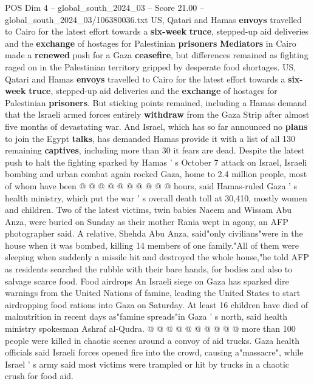 \begin{textsample}{POS Dim 4 – global\_south\_2024\_03 – Score 21.00 – global\_south\_2024\_03/106380036.txt}  \label{ex:f4_pos_102}
US, Qatari and Hamas \textbf{envoys} travelled to Cairo for the latest effort towards a \textbf{six-week} \textbf{truce}, stepped-up aid deliveries and the \textbf{exchange} of hostages for Palestinian \textbf{prisoners} \textbf{Mediators} in Cairo made a \textbf{renewed} push for a Gaza \textbf{ceasefire}, but differences remained as fighting raged on in the Palestinian territory gripped by desperate food shortages.
US, Qatari and Hamas \textbf{envoys} travelled to Cairo for the latest effort towards a \textbf{six-week} \textbf{truce}, stepped-up aid deliveries and the \textbf{exchange} of hostages for Palestinian \textbf{prisoners}.
But sticking points remained, including a Hamas demand that the Israeli armed forces entirely \textbf{withdraw} from the Gaza Strip after almost five months of devastating war.
And Israel, which has so far announced no \textbf{plans} to join the Egypt \textbf{talks}, has demanded Hamas provide it with a list of all 130 remaining \textbf{captives}, including more than 30 it fears are dead.
Despite the latest push to halt the fighting sparked by Hamas ' s October 7 attack on Israel, Israeli bombing and urban combat again rocked Gaza, home to 2.4 million people, most of whom have been @ @ @ @ @ @ @ @ @ @ hours, said Hamas-ruled Gaza ' s health ministry, which put the war ' s overall death toll at 30,410, mostly women and children.
Two of the latest victims, twin babies Naeem and Wissam Abu Anza, were buried on Sunday as their mother Rania wept in agony, an AFP photographer said.
A relative, Shehda Abu Anza, said"only civilians"were in the house when it was bombed, killing 14 members of one family."All of them were sleeping when suddenly a missile hit and destroyed the whole house,"he told AFP as residents searched the rubble with their bare hands, for bodies and also to salvage scarce food.
Food airdrops An Israeli siege on Gaza has sparked dire warnings from the United Nations of famine, leading the United States to start airdropping food rations into Gaza on Saturday.
At least 16 children have died of malnutrition in recent days as"famine spreads"in Gaza ' s north, said health ministry spokesman Ashraf al-Qudra. @ @ @ @ @ @ @ @ @ @ more than 100 people were killed in chaotic scenes around a convoy of aid trucks.
Gaza health officials said Israeli forces opened fire into the crowd, causing a"massacre", while Israel ' s army said most victims were trampled or hit by trucks in a chaotic crush for food aid.

\end{textsample}
